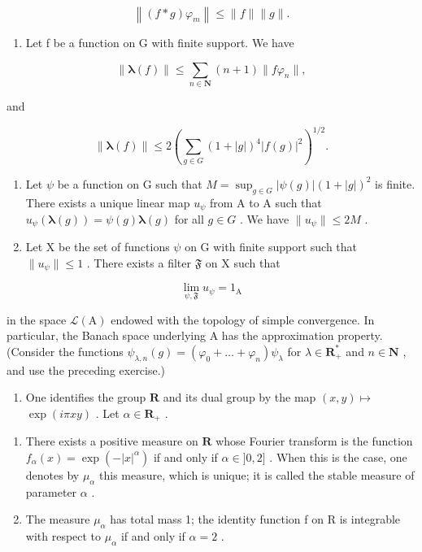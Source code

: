 \[
\left\| (f * g) \varphi_ {m} \right\| \leqslant \| f \| \| g \|.
\]

\begin{enumerate}
\def\labelenumi{\alph{enumi})}
\setcounter{enumi}{3}
\tightlist
\item
  Let f be a function on G with finite support. We have
\end{enumerate}

\[
\| \boldsymbol {\lambda} (f) \| \leqslant \sum_ {n \in \mathbf {N}} (n + 1) \| f \varphi_ {n} \|,
\]

and

\[
\left\| \boldsymbol {\lambda} (f) \right\| \leqslant 2 \left(\sum_ {g \in G} (1 + | g |) ^ {4} | f (g) | ^ {2}\right) ^ {1 / 2}.
\]

\begin{enumerate}
\def\labelenumi{\alph{enumi})}
\setcounter{enumi}{4}
\item
  Let \(\psi\) be a function on G such that \(M = \sup_{g \in G} |\psi(g)| (1 + |g|)^2\) is finite. There exists a unique linear map \(u_\psi\) from A to A such that \(u_\psi(\boldsymbol{\lambda}(g)) = \psi(g)\boldsymbol{\lambda}(g)\) for all \(g \in G\) . We have \(\|u_\psi\| \leqslant 2M\) .
\item
  Let X be the set of functions \(\psi\) on G with finite support such that \(\|u_{\psi}\|\leqslant1\) . There exists a filter \(\mathfrak{F}\) on X such that
\end{enumerate}

\[
\lim _ {\psi , \mathfrak {F}} u _ {\psi} = 1 _ {\mathrm{A}}
\]

in the space \(\mathcal{L}(\mathrm{A})\) endowed with the topology of simple convergence. In particular, the Banach space underlying A has the approximation property. (Consider the functions \(\psi_{\lambda,n}(g) = (\varphi_0 + \dots + \varphi_n)\psi_\lambda\) for \(\lambda \in \mathbf{R}_+^*\) and \(n \in \mathbf{N}\) , and use the preceding exercise.)

\begin{enumerate}
\def\labelenumi{\arabic{enumi})}
\setcounter{enumi}{7}
\tightlist
\item
  One identifies the group \(\mathbf{R}\) and its dual group by the map \((x,y)\mapsto\) \(\exp (i\pi xy)\) . Let \(\alpha \in \mathbf{R}_{+}\) .
\end{enumerate}

\begin{enumerate}
\def\labelenumi{\alph{enumi})}
\item
  There exists a positive measure on \(\mathbf{R}\) whose Fourier transform is the function \(f_{\alpha}(x) = \exp(-|x|^{\alpha})\) if and only if \(\alpha \in ]0,2]\) . When this is the case, one denotes by \(\mu_{\alpha}\) this measure, which is unique; it is called the stable measure of parameter \(\alpha\) .
\item
  The measure \(\mu_{\alpha}\) has total mass 1; the identity function f on R is integrable with respect to \(\mu_{\alpha}\) if and only if \(\alpha = 2\) .
\end{enumerate}

